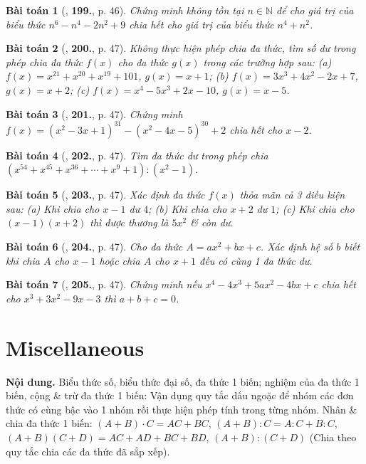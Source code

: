 \documentclass{article}
\numberwithin{equation}{section}
\newtheorem{baitoan}{Bài toán}
\begin{document}
\begin{baitoan}[\cite{Tuyen_Toan_7}, \textbf{199.}, p. 46]
	Chứng minh không tồn tại $n\in\mathbb{N}$ để cho giá trị của biểu thức $n^6 - n^4 - 2n^2 + 9$ chia hết cho giá trị của biểu thức $n^4 + n^2$.
\end{baitoan}

\begin{baitoan}[\cite{Tuyen_Toan_7}, \textbf{200.}, p. 47]
	Không thực hiện phép chia đa thức, tìm số dư trong phép chia đa thức $f(x)$ cho đa thức $g(x)$ trong các trường hợp sau: (a) $f(x) = x^{21} + x^{20} + x^{19} + 101$, $g(x) = x + 1$; (b) $f(x) = 3x^3 + 4x^2 - 2x + 7$, $g(x) = x + 2$; (c) $f(x) = x^4 - 5x^3 + 2x - 10$, $g(x) = x - 5$.
\end{baitoan}

\begin{baitoan}[\cite{Tuyen_Toan_7}, \textbf{201.}, p. 47]
	Chứng minh $f(x) = (x^2 - 3x + 1)^{31} - (x^2 - 4x - 5)^{30} + 2$ chia hết cho $x - 2$.
\end{baitoan}

\begin{baitoan}[\cite{Tuyen_Toan_7}, \textbf{202.}, p. 47]
	Tìm đa thức dư trong phép chia $(x^{54} + x^{45} + x^{36} + \cdots + x^9 + 1):(x^2 - 1)$.
\end{baitoan}

\begin{baitoan}[\cite{Tuyen_Toan_7}, \textbf{203.}, p. 47]
	Xác định đa thức $f(x)$ thỏa mãn cả 3 điều kiện sau: (a) Khi chia cho $x - 1$ dư $4$; (b) Khi chia cho $x + 2$ dư $1$; (c) Khi chia cho $(x - 1)(x + 2)$ thì được thương là $5x^2$ \& còn dư.
\end{baitoan}

\begin{baitoan}[\cite{Tuyen_Toan_7}, \textbf{204.}, p. 47]
	Cho đa thức $A = ax^2 + bx + c$. Xác định hệ số $b$ biết khi chia $A$ cho $x - 1$ hoặc chia $A$ cho $x + 1$ đều có cùng 1 đa thức dư.
\end{baitoan}

\begin{baitoan}[\cite{Tuyen_Toan_7}, \textbf{205.}, p. 47]
	Chứng minh nếu $x^4 - 4x^3 + 5ax^2 - 4bx + c$ chia hết cho $x^3 + 3x^2 - 9x - 3$ thì $a + b + c = 0$.
\end{baitoan}


\section{Miscellaneous}
\textsf{\textbf{Nội dung.} Biểu thức số, biểu thức đại số, đa thức 1 biến; nghiệm của đa thức 1 biến, cộng \& trừ đa thức 1 biến:} Vận dụng quy tắc dấu ngoặc để nhóm các đơn thức có cùng bậc vào 1 nhóm rồi thực hiện phép tính trong từng nhóm. \textsf{Nhân \& chia đa thức 1 biến:} $(A + B)\cdot C = AC + BC$, $(A + B):C = A:C + B:C$, $(A + B)(C + D) = AC + AD + BC + BD$, $(A + B):(C + D)$ (Chia theo quy tắc chia các đa thức đã sắp xếp).
\end{document}
